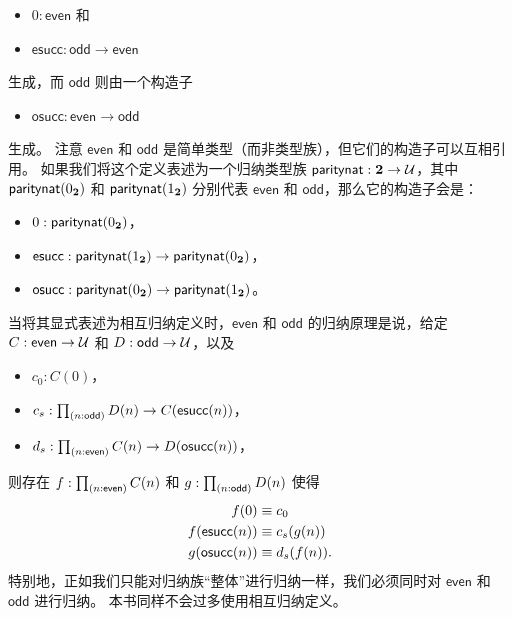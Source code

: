 \begin{itemize}
\item $0:\mathsf{even}$ 和
\item $\mathsf{esucc} : \mathsf{odd}\to\mathsf{even}$
\end{itemize}

生成，而 $\mathsf{odd}$ 则由一个构造子

\begin{itemize}
\item $\mathsf{osucc} : \mathsf{even}\to \mathsf{odd}$
\end{itemize}

生成。
注意 $\mathsf{even}$ 和 $\mathsf{odd}$ 是简单类型（而非类型族），但它们的构造子可以互相引用。
如果我们将这个定义表述为一个归纳类型族 $\mathsf{paritynat} : \mathbf{2} \to \mathcal{U}$，其中 $\mathsf{paritynat}({0_{\mathbf{2}}})$ 和 $\mathsf{paritynat}({1_{\mathbf{2}}})$ 分别代表 $\mathsf{even}$ 和 $\mathsf{odd}$，那么它的构造子会是：

\begin{itemize}
\item $0 : \mathsf{paritynat}({0_{\mathbf{2}}})$，
\item $\mathsf{esucc} : \mathsf{paritynat}({1_{\mathbf{2}}}) \to \mathsf{paritynat}({0_{\mathbf{2}}})$，
\item $\mathsf{osucc} : \mathsf{paritynat}({0_{\mathbf{2}}}) \to \mathsf{paritynat}({1_{\mathbf{2}}})$。
\end{itemize}

当将其显式表述为相互归纳定义时，$\mathsf{even}$ 和 $\mathsf{odd}$ 的归纳原理是说，给定 $C:\mathsf{even}\to\mathcal{U}$ 和 $D:\mathsf{odd}\to\mathcal{U}$，以及

\begin{itemize}
\item $c_0 : C(0)$，
\item $c_s : \prd{n:\mathsf{odd}} D(n) \to C(\mathsf{esucc}(n))$，
\item $d_s : \prd{n:\mathsf{even}} C(n) \to D(\mathsf{osucc}(n))$，
\end{itemize}

则存在 $f:\prd{n:\mathsf{even}} C(n)$ 和 $g:\prd{n:\mathsf{odd}}D(n)$ 使得
\begin{align*}
  f(0) &\equiv c_0\\
  f(\mathsf{esucc}(n)) &\equiv c_s(g(n))\\
  g(\mathsf{osucc}(n)) &\equiv d_s(f(n)).
\end{align*}
特别地，正如我们只能对归纳族``整体''进行归纳一样，我们必须同时对 $\mathsf{even}$ 和 $\mathsf{odd}$ 进行归纳。
本书同样不会过多使用相互归纳定义。

